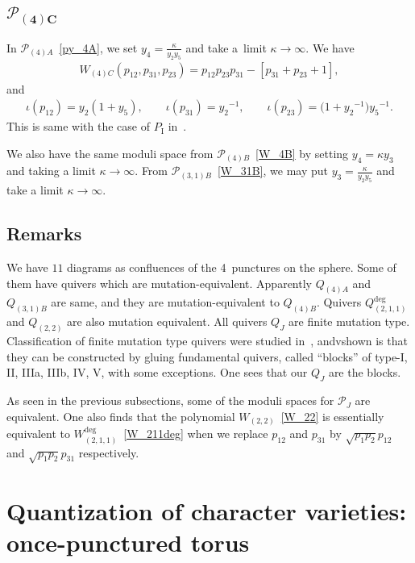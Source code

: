 \documentclass[pdftex]{sigma}
\numberwithin{equation}{section}
\begin{document}
\subsection[$\mathcal{P}_{(4)C}$]{$\boldsymbol{\mathcal{P}_{(4)C}}$}
In $\mathcal{P}_{(4)A}$~\eqref{py_4A}, we set $y_4=\frac{\kappa}{y_2 y_5}$ and take a~limit $\kappa \to \infty$. We have
\begin{gather*}
 W_{(4)C}(p_{12}, p_{31}, p_{23}) = p_{12} p_{23} p_{31} - [ p_{31}+ p_{23} + 1 ] ,
\end{gather*}
and
\begin{gather*}
 \iota(p_{12}) = y_2 ( 1 + y_5 ) ,\qquad \iota(p_{31}) = {y_2}^{-1}, \qquad \iota(p_{23}) = \big( 1+{y_2}^{-1} \big) {y_5}^{-1} .
\end{gather*}
This is same with the case of $P_{\mathrm{I}}$ in~\cite{vdPutSaito09a}.

We also have the same moduli space from $\mathcal{P}_{(4)B}$~\eqref{W_4B} by setting $y_4 = \kappa y_3$ and taking a limit $\kappa \to \infty$. From $\mathcal{P}_{(3,1)B}$~\eqref{W_31B}, we may put $y_3=\frac{\kappa}{y_2 y_5}$ and take a limit $\kappa\to\infty$.

\subsection{Remarks}
We have $11$ diagrams as confluences of the 4~punctures on the sphere. Some of them have quivers which are mutation-equivalent. Apparently $Q_{(4)A}$ and $Q_{(3,1)B}$ are same, and they are mutation-equivalent to $Q_{(4)B}$.
Quivers $Q_{(2,1,1)}^{\text{deg}}$ and $Q_{(2,2)}$ are also mutation equivalent. All quivers $Q_J$ are finite mutation type. Classification of finite mutation type quivers were studied in~\cite{FeliShapTuma12a, FomiShapThur08a}, andvshown is that they can be constructed by gluing fundamental quivers, called ``blocks'' of type-I, II, IIIa, IIIb, IV, V, with some exceptions. One sees that our $Q_J$ are the blocks.

As seen in the previous subsections, some of the moduli spaces for $\mathcal{P}_J$ are equivalent. One also finds that the polynomial $W_{(2,2)}$~\eqref{W_22} is essentially equivalent to $W_{(2,1,1)}^{\text{deg}}$~\eqref{W_211deg} when we replace $p_{12}$ and $p_{31}$ by $\sqrt{p_1 p_2} p_{12}$ and $\sqrt{p_1 p_2} p_{31}$ respectively.

\section{Quantization of character varieties: once-punctured torus}\label{sec:q_torus}
\end{document}
